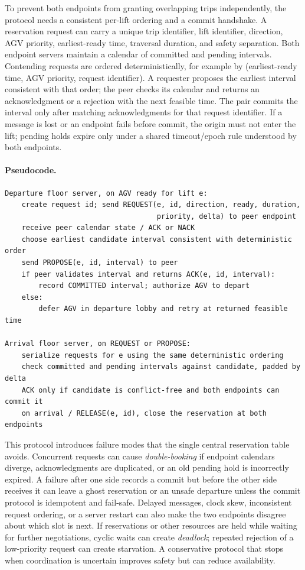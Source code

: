 \documentclass[11pt]{article}
\begin{document}
To prevent both endpoints from granting overlapping trips independently, the
protocol needs a consistent per-lift ordering and a commit handshake. A
reservation request can carry a unique trip identifier, lift identifier,
direction, AGV priority, earliest-ready time, traversal duration, and safety
separation. Both endpoint servers maintain a calendar of committed and
pending intervals. Contending requests are ordered deterministically, for
example by (earliest-ready time, AGV priority, request identifier). A
requester proposes the earliest interval consistent with that order; the
peer checks its calendar and returns an acknowledgment or a rejection with
the next feasible time. The pair commits the interval only after matching
acknowledgments for that request identifier. If a message is lost or an
endpoint fails before commit, the origin must not enter the lift; pending
holds expire only under a shared timeout/epoch rule understood by both
endpoints.

\paragraph{Pseudocode.}
\begin{verbatim}
Departure floor server, on AGV ready for lift e:
    create request id; send REQUEST(e, id, direction, ready, duration,
                                    priority, delta) to peer endpoint
    receive peer calendar state / ACK or NACK
    choose earliest candidate interval consistent with deterministic order
    send PROPOSE(e, id, interval) to peer
    if peer validates interval and returns ACK(e, id, interval):
        record COMMITTED interval; authorize AGV to depart
    else:
        defer AGV in departure lobby and retry at returned feasible time

Arrival floor server, on REQUEST or PROPOSE:
    serialize requests for e using the same deterministic ordering
    check committed and pending intervals against candidate, padded by delta
    ACK only if candidate is conflict-free and both endpoints can commit it
    on arrival / RELEASE(e, id), close the reservation at both endpoints
\end{verbatim}

This protocol introduces failure modes that the single central reservation
table avoids. Concurrent requests can cause \emph{double-booking} if endpoint
calendars diverge, acknowledgments are duplicated, or an old pending hold is
incorrectly expired. A failure after one side records a commit but before the
other side receives it can leave a ghost reservation or an unsafe departure
unless the commit protocol is idempotent and fail-safe. Delayed messages,
clock skew, inconsistent request ordering, or a server restart can also make
the two endpoints disagree about which slot is next. If reservations or
other resources are held while waiting for further negotiations, cyclic
waits can create \emph{deadlock}; repeated rejection of a low-priority
request can create starvation. A conservative protocol that stops when
coordination is uncertain improves safety but can reduce availability.
\end{document}
